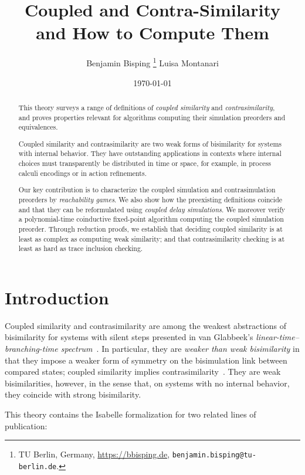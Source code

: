 \documentclass[10pt,a4paper]{article}
\title{ \textbf{Coupled and Contra-Similarity} \\ \Large and How to Compute Them }
\author{ Benjamin Bisping%
  \footnote{TU Berlin, Germany,
    \url{https://bbisping.de}, \texttt{benjamin.bisping@tu-berlin.de}.}%
  \qquad Luisa Montanari%
 }
\date{\today}
\begin{document}
\maketitle

\begin{abstract}
\noindent
This theory surveys a range of definitions of \emph{coupled similarity} and \emph{contrasimilarity},
and proves properties relevant for algorithms computing their simulation preorders and equivalences.

Coupled similarity and contrasimilarity are two weak forms of bisimilarity for systems with
internal behavior.
They have outstanding applications in contexts where internal choices must transparently be
distributed in time or space, for example, in process calculi encodings or in action refinements.

Our key contribution is to characterize the coupled simulation and contrasimulation preorders by \emph{reachability games}.
We also show how the preexisting definitions coincide and that they can be reformulated using \emph{coupled delay simulations}.
We moreover verify a polynomial-time coinductive fixed-point algorithm computing the coupled simulation preorder.
Through reduction proofs, we establish that deciding coupled similarity is at least as complex
as computing weak similarity; and that contrasimilarity checking is at least as hard as trace inclusion
checking.
\end{abstract}

\tableofcontents

\section{Introduction}

Coupled similarity and contrasimilarity are among the weakest abstractions of bisimilarity for systems
with silent steps presented in van Glabbeek's \emph{linear-time--branching-time spectrum}~\cite{glabbeek1993ltbt}.
In particular, they are \emph{weaker than weak bisimilarity} in that they impose a weaker form of
symmetry on the bisimulation link between compared states; coupled similarity implies
contrasimilarity~\cite{bnp2020coupledsim32}. They are weak bisimilarities, however, in the sense
that, on systems with no internal behavior, they coincide with strong bisimilarity.

This theory contains the Isabelle formalization for two related lines of publication:
\end{document}
